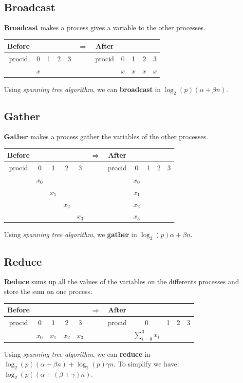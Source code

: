 \documentclass[12pt, openany]{report}
\theoremstyle{definition}
\begin{document}
\subsection{Broadcast}
\textbf{Broadcast} makes a process gives a variable to the other processes.\\
\begin{center}
	\begin{tabular}{ccccc|c|ccccc}
		Before &&&&& $\Longrightarrow$ &After&&&&\\
		\hline
		procid & 0 & 1 & 2 & 3 & & procid & 0 & 1 & 2 & 3\\
		\hline
		& $x$ &&&&& & $x$ & $x$ & $x$ & $x$\\
		\hline
	\end{tabular}
\end{center}
Using \textit{spanning tree algorithm}, we can \textbf{broadcast} in $\log_2(p)(\alpha + \beta n)$.
\subsection{Gather}
\textbf{Gather} makes a process gather the variables of the other processes.\\
\begin{center}
	\begin{tabular}{ccccc|c|ccccc}
		Before &&&&& $\Longrightarrow$ &After&&&&\\
		\hline
		procid & 0 & 1 & 2 & 3 & & procid & 0 & 1 & 2 & 3\\
		\hline
		& $x_0$ &&&&& & $x_0$ &&&\\
		&& $x_1$ &&&& & $x_1$ &&&\\
		&&& $x_2$ &&& & $x_2$ &&&\\
		&&&& $x_3$ && & $x_3$ &&&\\
		\hline
	\end{tabular}
\end{center}
Using \textit{spanning tree algorithm}, we \textbf{gather} in $\log_2(p)\alpha + \beta n$.
\subsection{Reduce}
\textbf{Reduce} sums up all the values of the variables on the differents processes and store the sum on one process.\\
\begin{center}
	\begin{tabular}{ccccc|c|ccccc}
		Before &&&&& $\Longrightarrow$ &After&&&&\\
		\hline
		procid & 0 & 1 & 2 & 3 & & procid & 0 & 1 & 2 & 3\\
		\hline
		& $x_0$ & $x_1$ & $x_2$ & $x_3$ && & $\displaystyle \sum_{i=0}^{3} x_i$ &&&\\
		\hline
	\end{tabular}
\end{center}
Using \textit{spanning tree algorithm}, we can \textbf{reduce} in $\log_2(p)(\alpha + \beta n) + \log_2(p) \gamma n$. To simplify we have: $\log_2(p)(\alpha + (\beta + \gamma) n)$.
\end{document}
